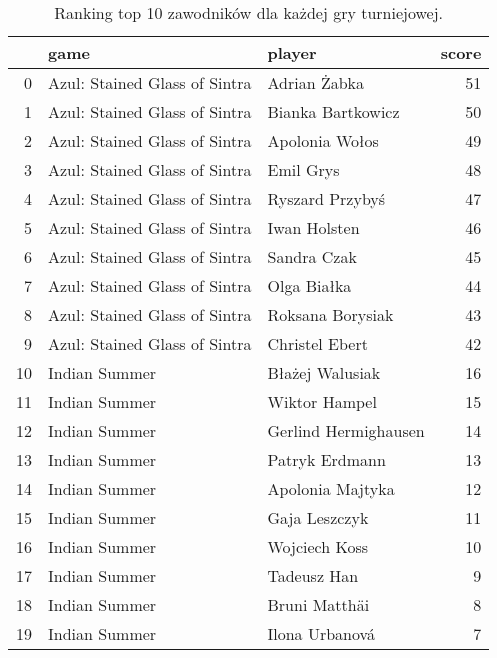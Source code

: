 \begin{table}[h]
\centering
\caption{Ranking top 10 zawodników dla każdej gry turniejowej.}\label{tab:tab2}
\begin{tabular}{rllr}
\hline
    & game                           & player                &   score \\
\hline
  0 & Azul: Stained Glass of Sintra  & Adrian Żabka          &      51 \\
  1 & Azul: Stained Glass of Sintra  & Bianka Bartkowicz     &      50 \\
  2 & Azul: Stained Glass of Sintra  & Apolonia Wołos        &      49 \\
  3 & Azul: Stained Glass of Sintra  & Emil Grys             &      48 \\
  4 & Azul: Stained Glass of Sintra  & Ryszard Przybyś       &      47 \\
  5 & Azul: Stained Glass of Sintra  & Iwan Holsten          &      46 \\
  6 & Azul: Stained Glass of Sintra  & Sandra Czak           &      45 \\
  7 & Azul: Stained Glass of Sintra  & Olga Białka           &      44 \\
  8 & Azul: Stained Glass of Sintra  & Roksana Borysiak      &      43 \\
  9 & Azul: Stained Glass of Sintra  & Christel Ebert        &      42 \\
 10 & Indian Summer                  & Błażej Walusiak       &      16 \\
 11 & Indian Summer                  & Wiktor Hampel         &      15 \\
 12 & Indian Summer                  & Gerlind Hermighausen  &      14 \\
 13 & Indian Summer                  & Patryk Erdmann        &      13 \\
 14 & Indian Summer                  & Apolonia Majtyka      &      12 \\
 15 & Indian Summer                  & Gaja Leszczyk         &      11 \\
 16 & Indian Summer                  & Wojciech Koss         &      10 \\
 17 & Indian Summer                  & Tadeusz Han           &       9 \\
 18 & Indian Summer                  & Bruni Matthäi         &       8 \\
 19 & Indian Summer                  & Ilona Urbanová        &       7 \\

\end{tabular}
\end{table}
